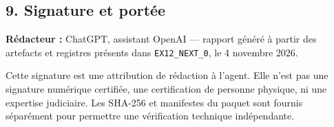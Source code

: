 \documentclass[
]{article}
\begin{document}
\subsection{9. Signature et portée}\label{signature-et-portuxe9e}

\textbf{Rédacteur :} ChatGPT, assistant OpenAI --- rapport généré à
partir des artefacts et registres présents dans \texttt{EX12\_NEXT\_0},
le 4 novembre 2026.

Cette signature est une attribution de rédaction à l'agent. Elle n'est
pas une signature numérique certifiée, une certification de personne
physique, ni une expertise judiciaire. Les SHA-256 et manifestes du
paquet sont fournis séparément pour permettre une vérification technique
indépendante.
\end{document}

